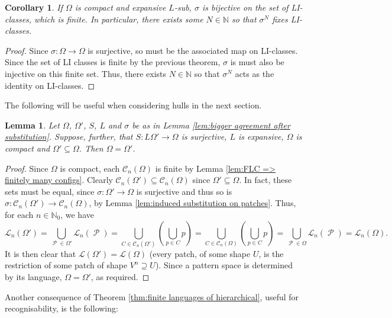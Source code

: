 \documentclass[11pt]{amsart}
\numberwithin{equation}{section}
\theoremstyle{plain}
\newtheorem{lemma}[theorem]{Lemma}
\newtheorem{corollary}[theorem]{Corollary}
\theoremstyle{definition}
\newcommand{\N}{\mathbb N}
\newcommand{\sub}{\sigma}
\DeclareMathOperator{\cP}{\mathcal{P}}
\newcommand{\lang}{\mathscr{L}}
\begin{document}
\begin{corollary}\label{cor:power fixing LI-classes}
If \(\Omega\) is compact and expansive \(L\)-sub, \(\sub\) is bijective on the set of LI-classes, which is finite. In particular, there exists some \(N \in \N\) so that \(\sub^N\) fixes LI-classes.
\end{corollary}

\begin{proof}
Since \(\sub \colon \Omega \to \Omega\) is surjective, so must be the associated map on LI-classes. Since the set of LI classes is finite by the previous theorem, \(\sub\) is must also be injective on this finite set. Thus, there exists \(N \in \N\) so that \(\sub^N\) acts as the identity on LI-classes.
\end{proof}

The following will be useful when considering hulls in the next section.

\begin{lemma}\label{lem:expansive on sub-PS surjective=>equal PS}
Let \(\Omega\), \(\Omega'\), \(S\), \(L\) and \(\sub\) be as in Lemma \ref{lem:bigger agreement after substitution}. Suppose, further, that \(S \colon L\Omega' \to \Omega\) is surjective, \(L\) is expansive, \(\Omega\) is compact and \(\Omega' \subseteq \Omega\). Then \(\Omega = \Omega'\).
\end{lemma}

\begin{proof}
Since \(\Omega\) is compact, each \(\mathscr{C}_n(\Omega)\) is finite by Lemma \ref{lem:FLC => finitely many configs}. Clearly \(\mathscr{C}_n(\Omega') \subseteq \mathscr{C}_n(\Omega)\) since \(\Omega' \subseteq \Omega\). In fact, these sets must be equal, since \(\sub \colon \Omega' \to \Omega\) is surjective and thus so is \(\sub \colon \mathscr{C}_n(\Omega') \to \mathscr{C}_n(\Omega)\), by Lemma \ref{lem:induced substitution on patches}. Thus, for each \(n \in \N_0\), we have
\[
\lang_n(\Omega') = \bigcup_{\cP \in \Omega'} \lang_n(\cP) = \bigcup_{C \in \mathscr{C}_n(\Omega')} \left( \bigcup_{p \in C} p \right) = \bigcup_{C \in \mathscr{C}_n(\Omega)} \left( \bigcup_{p \in C} p \right) = \bigcup_{\cP \in \Omega} \lang_n(\cP) = \lang_n(\Omega) .
\]
It is then clear that \(\lang(\Omega') = \lang(\Omega)\) (every patch, of some shape \(U\), is the restriction of some patch of shape \(V^n \supseteq U\)). Since a pattern space is determined by its language, \(\Omega = \Omega'\), as required.
\end{proof}

Another consequence of Theorem \ref{thm:finite languages of hierarchical}, useful for recognisability, is the following:
\end{document}
